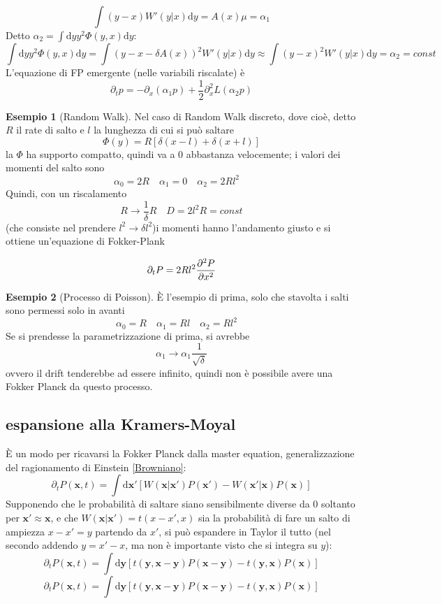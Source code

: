 \documentclass[a4paper,12pt]{article}
\theoremstyle{plain}
\renewcommand{\vec}[1]{{\boldsymbol{#1}}}
\theoremstyle{definition}
\newtheorem{exmp}{Esempio}[section]
\newcommand{\f}[2]{\frac{#1}{#2}}
\newcommand{\tdv}{\partial_t}
\renewcommand{\d}{\text{d}}
\newcommand{\pos}{\vec{x}}
\newcommand{\ra}{\rightarrow}
\theoremstyle{remark}
\begin{document}
\[\int	(y-x) W'(y|x) \d y= A(x)	\mu=\alpha_1\]
Detto $\alpha_2=\int \d y y^2\Phi(y,x)\d y$:
\[\int \d y y^2\Phi(y,x)\d y=\int (y-x-\delta A(x))^2 W'(y|x)	\d y	\approx\int (y-x)^2 W'(y|x)	\d y=\alpha_2=const	\]
L'equazione di FP emergente (nelle variabili riscalate) è
\[\tdv{p}=-\partial_x (\alpha_1 p)+\f{1}{2}\partial^2_x L(\alpha_2 p)\]

\begin{exmp}[Random Walk]
Nel caso di Random Walk discreto, dove cioè, detto $R$ il rate di salto e $l$ la lunghezza di cui si può saltare
\[\Phi(y)=R\left[\delta(x-l)+\delta(x+l)					\right]\]
la $\Phi$ ha supporto compatto, quindi va a 0 abbastanza velocemente; i valori dei momenti del salto sono
\[\alpha_0=2R \quad\alpha_1=0 \quad\alpha_2=2R l^2 \quad\]
Quindi, con un riscalamento 
\[R\ra\f{1}{\delta}R\quad D=2l^2 R=const
\]
 (che consiste nel prendere $l^2\ra \delta l^2$)i momenti hanno l'andamento giusto e si ottiene un'equazione di Fokker-Plank 

\[\tdv P=2 R l^2\pdv[2]{P}{x}\]



\end{exmp}
\begin{exmp}[Processo di Poisson]
È l'esempio di prima, solo che stavolta i salti sono permessi solo in avanti
\[\alpha_0=R \quad\alpha_1=R l \quad\alpha_2=R l^2 \quad\]
Se si prendesse la parametrizzazione di prima, si avrebbe
\[		\alpha_1\ra \alpha_1 \f{1}{\sqrt{\delta}}		\]
ovvero il drift tenderebbe ad essere infinito, quindi non è possibile avere una Fokker Planck da questo processo.

\end{exmp}\subsection{espansione alla Kramers-Moyal}
È un modo per ricavarsi la Fokker Planck dalla master equation, generalizzazione del ragionamento di Einstein \ref{Browniano}: 
\[\tdv P(\pos,t)=\int \d \pos'	\left[W(\pos|\pos')P(\pos')-W(\pos'|\pos)P(\pos)\right]	\]
Supponendo che le probabilità di saltare siano sensibilmente diverse da $0$ soltanto per $\pos'\approx \pos$, e che $W(\pos|\pos')=t(x-x',x )$ sia la probabilità di fare un salto di ampiezza $x-x'=y$ partendo da $x'$, si può espandere in Taylor il tutto (nel secondo addendo $y=x'-x$, ma non è importante visto che si integra su $y$):
\[\tdv P(\pos,t)=\int \d \vec{y}\left[t(\vec{y},\pos-\vec{y})P(\pos-\vec{y})-t(\vec{y},\pos)P(\pos)\right]	\]
\[\tdv P(\pos,t)=\int \d \vec{y}\left[t(\vec{y},\pos-\vec{y})P(\pos-\vec{y})-t(\vec{y},\pos)P(\pos)\right]\]
\end{document}
